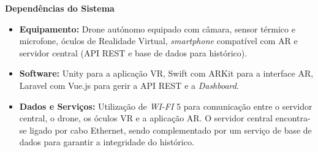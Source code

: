 \documentclass[conference,a4paper]{IEEEtran}
\begin{document}
\textbf{Dependências do Sistema}
\begin{itemize}
    \item \textbf{Equipamento:} Drone autónomo equipado com câmara, sensor térmico e microfone, óculos de Realidade Virtual, \textit{smartphone} compatível com AR e servidor central (API REST e base de dados para histórico).
    \item \textbf{Software:} Unity para a aplicação VR, Swift com ARKit para a interface AR, Laravel com Vue.js para gerir a API REST e a \textit{Dashboard}.
    \item \textbf{Dados e Serviços:} Utilização de \textit{WI-FI} 5 para comunicação entre o servidor central, o drone, os óculos VR e a aplicação AR. O servidor central encontra-se ligado por cabo Ethernet, sendo complementado por um serviço de base de dados para garantir a integridade do histórico. 
\end{itemize}
\end{document}
